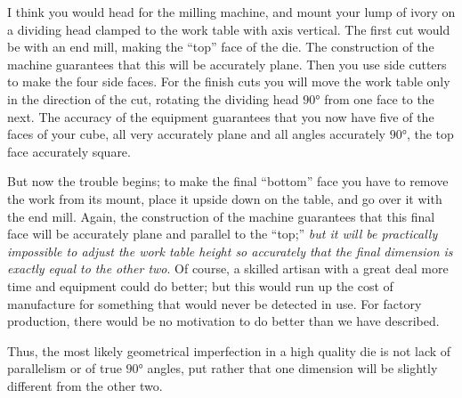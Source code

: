 I think you would head for the milling machine, and mount your lump of ivory on a dividing head clamped to the work table with axis vertical.
The first cut would be with an end mill, making the ``top'' face of the die.
The construction of the machine guarantees that this will be accurately plane.
Then you use side cutters to make the four side faces.
For the finish cuts you will move the work table only in the direction of the cut, rotating the dividing head $90$° from one face to the next.
The accuracy of the equipment guarantees that you now have five of the faces of your cube, all very accurately plane and all angles accurately $90$°, the top face accurately square.

But now the trouble begins; to make the final ``bottom'' face you have to remove the work from its mount, place it upside down on the table, and go over it with the end mill.
Again, the construction of the machine guarantees that this final face will be accurately plane and parallel to the ``top;'' \emph{but it will be practically impossible to adjust the work table height so accurately that the final dimension is exactly equal to the other two}.
Of course, a skilled artisan with a great deal more time and equipment could do better; but this would run up the cost of manufacture for something that would never be detected in use.
For factory production, there would be no motivation to do better than we have described.

Thus, the most likely geometrical imperfection in a high quality die is not lack of parallelism or of true $90$° angles, put rather that one dimension will be slightly different from the other two.

